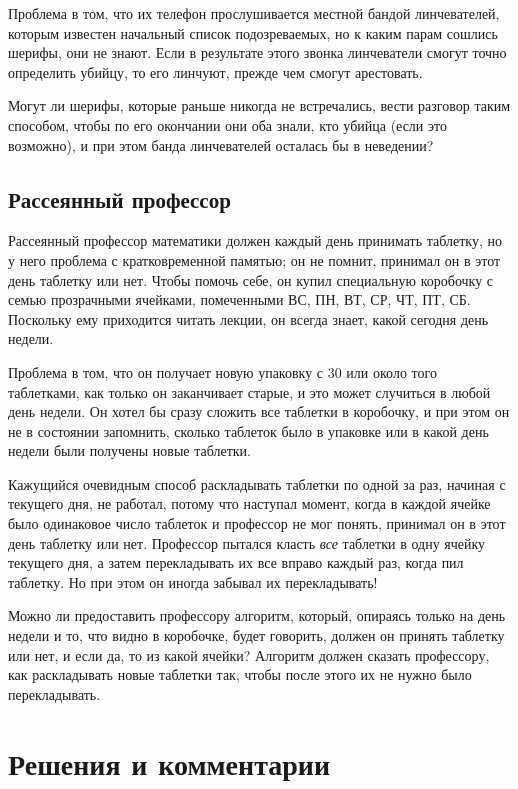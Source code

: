 \documentclass[twoside]{book}
\makeatletter
\newcommand{\rindex}[2][\imki@jobname]{%
  \index[#1]{\detokenize{#2}}%
}
\makeatother
\begin{document}
Проблема в том, что их телефон прослушивается местной бандой линчевателей, которым известен начальный список подозреваемых, но к каким парам сошлись шерифы, они не знают.
Если в результате этого звонка линчеватели смогут точно определить убийцу, то его линчуют, прежде чем смогут арестовать.

Могут ли шерифы, которые раньше никогда не встречались, вести разговор таким способом, чтобы по его окончании они оба знали, кто убийца (если это возможно), и при этом банда линчевателей осталась бы в неведении?

\subsection*{Рассеянный профессор}%
\rindex{Рассеянный профессор}

Рассеянный профессор математики должен каждый день принимать таблетку, но у него проблема с кратковременной памятью; он не помнит, принимал он в этот день таблетку или нет.
Чтобы помочь себе, он купил специальную коробочку с семью прозрачными ячейками, помеченными ВС, ПН, ВТ, СР, ЧТ, ПТ, СБ.
Поскольку ему приходится читать лекции, он всегда знает, какой сегодня день недели.

Проблема в том, что он получает новую упаковку с 30 или около того таблетками, как только он заканчивает старые, и это может случиться в любой день недели.
Он хотел бы сразу сложить все таблетки в коробочку, и при этом он не в состоянии запомнить, сколько таблеток было в упаковке или в какой день недели были получены новые таблетки.

Кажущийся очевидным способ раскладывать таблетки по одной за раз, начиная с текущего дня, не работал, потому что наступал момент, когда в каждой ячейке было одинаковое число таблеток и профессор не мог понять, принимал он в этот день таблетку или нет.
Профессор пытался класть \emph{все} таблетки в одну ячейку текущего дня, а затем перекладывать их все вправо каждый раз, когда пил таблетку.
Но при этом он иногда забывал их перекладывать!

Можно ли предоставить профессору алгоритм, который, опираясь только на день недели и то, что видно в коробочке,  будет говорить, должен он принять таблетку или нет, и если да, то из какой ячейки?
Алгоритм должен сказать профессору, как раскладывать новые таблетки
так, чтобы после этого их не нужно было перекладывать.


\section*{Решения и комментарии}
\end{document}
